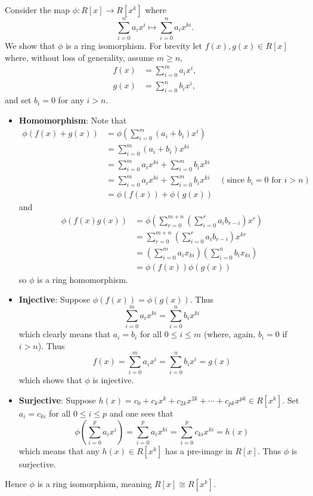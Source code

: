 \begin{questions}
    \item Consider the map $\phi: R[x] \to R[x^k]$ where
    \[
        \sum_{i=0}^n a_ix^i \mapsto \sum_{i=0}^na_ix^{ki}.
    \]
    We show that $\phi$ is a ring isomorphism. For brevity let $f(x), g(x) \in R[x]$ where, without loss of generality, assume $m \geq n$,
    \begin{align*}
        f(x) &= \sum_{i=0}^m a_ix^i,\\
        g(x) &= \sum_{i=0}^n b_ix^i,
    \end{align*}
    and set $b_i = 0$ for any $i > n$.
    \begin{itemize}
        \item \textbf{Homomorphism}: Note that
        \begin{align*}
            \phi(f(x) + g(x)) &= \phi\left(\sum_{i=0}^m(a_i+b_i)x^i\right)\\
            &= \sum_{i=0}^m(a_i+b_i)x^{ki}\\
            &= \sum_{i=0}^ma_ix^{ki} + \sum_{i=0}^mb_ix^{ki}\\
            &= \sum_{i=0}^ma_ix^{ki} + \sum_{i=0}^mb_ix^{ki} & (\text{since } b_i = 0 \text{ for } i > n)\\
            &= \phi(f(x)) + \phi(g(x))
        \end{align*}
        and
        \begin{align*}
            \phi(f(x)g(x)) &= \phi\left(\sum_{r=0}^{m+n}\left(\sum_{i=0}^ra_ib_{r-i}\right)x^r\right)\\
            &= \sum_{r=0}^{m+n}\left(\sum_{i=0}^ra_ib_{r-i}\right)x^{kr}\\
            &= \left(\sum_{i=0}^ma_ix_{ki}\right)\left(\sum_{i=0}^nb_ix_{ki}\right)\\
            &= \phi(f(x))\phi(g(x))
        \end{align*}
        so $\phi$ is a ring homomorphism.

        \item \textbf{Injective}: Suppose $\phi(f(x)) = \phi(g(x))$. Thus
        \[
            \sum_{i=0}^m a_ix^{ki} = \sum_{i=0}^n b_ix^{ki}
        \]
        which clearly means that $a_i = b_i$ for all $0 \leq i \leq m$ (where, again, $b_i = 0$ if $i > n$). Thus
        \[
            f(x) = \sum_{i=0}^m a_ix^i = \sum_{i=0}^n b_ix^i = g(x)
        \]
        which shows that $\phi$ is injective.

        \item \textbf{Surjective}: Suppose $h(x) = c_0 + c_kx^k + c_{2k}x^{2k} + \cdots + c_{pk}x^{pk} \in R[x^k]$. Set $a_i = c_{ki}$ for all $0 \leq i \leq p$ and one sees that
        \[
            \phi\left(\sum_{i=0}^pa_ix^i\right) = \sum_{i=0}^pa_ix^{ki} = \sum_{i=0}^pc_{ki}x^{ki} = h(x)
        \]
        which means that any $h(x) \in R[x^k]$ has a pre-image in $R[x]$. Thus $\phi$ is surjective.
    \end{itemize}
    Hence $\phi$ is a ring isomorphism, meaning $R[x] \cong R[x^k]$.


\end{questions}
